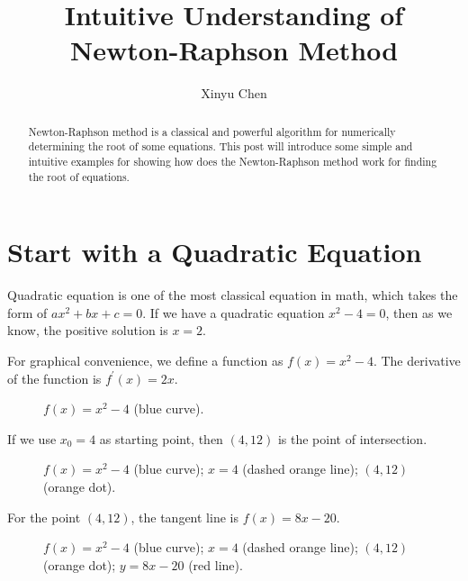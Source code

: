 \documentclass[12pt]{article}
\title{Intuitive Understanding of Newton-Raphson Method}
\author{Xinyu Chen}
\begin{document}
\large
\maketitle

\begin{abstract}
Newton-Raphson method is a classical and powerful algorithm for numerically determining the root of some equations. This post will introduce some simple and intuitive examples for showing how does the Newton-Raphson method work for finding the root of equations.
\end{abstract}

\section{Start with a Quadratic Equation}

Quadratic equation is one of the most classical equation in math, which takes the form of $ax^2+bx+c=0$. If we have a quadratic equation $x^2-4=0$, then as we know, the positive solution is $x=2$.

For graphical convenience, we define a function as $f(x)=x^2-4$. The derivative of the function is $f^\prime(x)=2x$.

\begin{figure}[h]
    \centering
    
    \caption{{\color{blue}$f(x)=x^2-4$} (blue curve).}
    \label{example1_s1}
\end{figure}

\clearpage

If we use $x_0=4$ as starting point, then $(4,12)$ is the point of intersection.

\begin{figure}[h]
    \centering
    
    \caption{{\color{blue}$f(x)=x^2-4$} (blue curve); {\color{orange}$x=4$} (dashed orange line); {\color{orange}$(4,12)$} (orange dot).}
    \label{example1_s2}
\end{figure}

For the point $(4,12)$, the tangent line is $f(x)=8x-20$.

\begin{figure}[h]
    \centering
    
    \caption{{\color{blue}$f(x)=x^2-4$} (blue curve); {\color{orange}$x=4$} (dashed orange line); {\color{orange}$(4,12)$} (orange dot); {\color{red}$y=8x-20$} (red line).}
    \label{example1_s3}
\end{figure}

\clearpage
\end{document}
